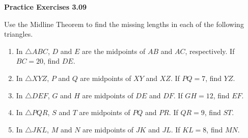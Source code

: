 \vspace{0.3ex}
\noindent\textbf{Practice Exercises 3.09}

\vspace{0.2ex}

Use the Midline Theorem to find the missing lengths in each of the following triangles.
\begin{enumerate}[label=\color{blue}\arabic*.]
    \item In \(\bigtriangleup ABC\), \(D\) and \(E\) are the midpoints of \(AB\) and \(AC\), respectively. If \(BC = 20\), find \(DE\).
    \item In \(\bigtriangleup XYZ\), \(P\) and \(Q\) are midpoints of \(XY\) and \(XZ\). If \(PQ = 7\), find \(YZ\).
    \item In \(\bigtriangleup DEF\), \(G\) and \(H\) are midpoints of \(DE\) and \(DF\). If \(GH = 12\), find \(EF\).
    \item In \(\bigtriangleup PQR\), \(S\) and \(T\) are midpoints of \(PQ\) and \(PR\). If \(QR = 9\), find \(ST\).
    \item In \(\bigtriangleup JKL\), \(M\) and \(N\) are midpoints of \(JK\) and \(JL\). If \(KL = 8\), find \(MN\).
\end{enumerate}
